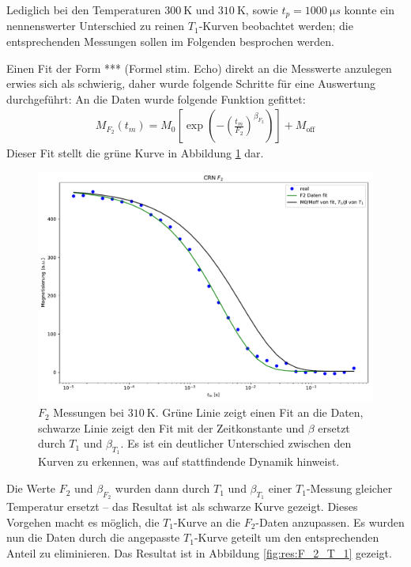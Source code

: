 Lediglich bei den Temperaturen $\SI{300}{\kelvin}$ und $\SI{310}{\kelvin}$, sowie $t_p = \SI{1000}{\micro s}$ konnte ein nennenswerter Unterschied zu reinen $T_1$-Kurven beobachtet werden; die entsprechenden Messungen sollen im Folgenden besprochen werden.

Einen Fit der Form *** (Formel stim. Echo) direkt an die Messwerte anzulegen erwies sich als schwierig, daher wurde folgende Schritte für eine Auswertung durchgeführt: An die Daten wurde folgende Funktion gefittet:
\begin{align}
	M_{F_2} (t_m) = M_0 \left[ \exp{ \left(- { \left( \frac{t_m}{F_2} \right) }^{\beta_{F_2}} \right)} \right] + M_\text{off} \label{eqn:res:F_2_fit}
\end{align}
Dieser Fit stellt die grüne Kurve in Abbildung \ref{fig:res:F_2_fit} dar.
\begin{figure}
	\begin{center}
		\includegraphics[width=.9\textwidth]{graphics/plots/F2/f2_fits.pdf}
	\end{center}
	\caption{$F_2$ Messungen bei $\SI{310}{\kelvin}$. Grüne Linie zeigt einen Fit an die Daten, schwarze Linie zeigt den Fit mit der Zeitkonstante und $\beta$ ersetzt durch $T_1$ und $\beta_{T_1}$. Es ist ein deutlicher Unterschied zwischen den Kurven zu erkennen, was auf stattfindende Dynamik hinweist.} \label{fig:res:F_2_fit}
\end{figure}
Die Werte $F_2$ und $\beta_{F_2}$ wurden dann durch $T_1$ und $\beta_{T_1}$ einer $T_1$-Messung gleicher Temperatur ersetzt -- das Resultat ist als schwarze Kurve gezeigt. Dieses Vorgehen macht es möglich, die $T_1$-Kurve an die $F_2$-Daten anzupassen. Es wurden nun die Daten durch die angepasste $T_1$-Kurve geteilt um den entsprechenden Anteil zu eliminieren. Das Resultat ist in Abbildung \ref{fig:res:F_2_T_1} gezeigt.
